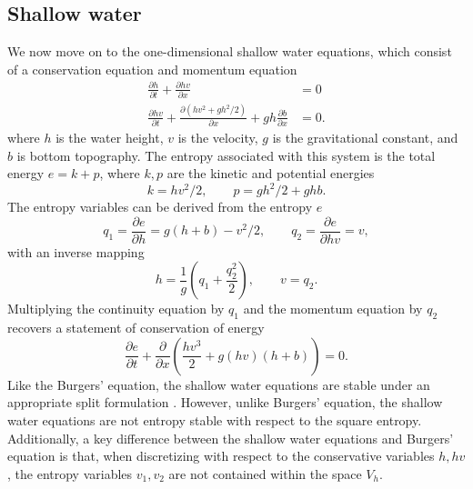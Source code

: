 \documentclass[preprint,10pt]{article}
\theoremstyle{definition}
\theoremstyle{lemma}
\theoremstyle{theorem}
\theoremstyle{assumption}
\newcommand{\pd}[2]{\frac{\partial#1}{\partial#2}}
\newcommand{\LRp}[1]{\left( #1 \right)}
\newcommand{\note}[1]{{\color{blue}{#1}}}
\begin{document}
%
%

%

\subsection{Shallow water}

We now move on to the one-dimensional shallow water equations, which consist of a conservation equation and momentum equation
\begin{align*}
\pd{h}{t} + \pd{hv}{x} &= 0\\
\pd{hv}{t} + \pd{\LRp{hv^2 + gh^2/2}}{x} + gh\pd{b}{x}&= 0.
\end{align*}
where $h$ is the water height, $v$ is the velocity, $g$ is the gravitational constant, and $b$ is bottom topography.  The entropy associated with this system is the total energy $e = k + p$, where $k, p$ are the kinetic and potential energies
\[
k = hv^2/2, \qquad p = gh^2/2 + ghb.
\]
The entropy variables can be derived from the entropy $e$
\[
q_1 = \pd{e}{h} = g(h+b)-v^2/2, \qquad q_2 = \pd{e}{hv} = v,
\]
with an inverse mapping
\[
h = \frac{1}{g}\LRp{q_1 + \frac{q_2^2}{2}}, \qquad v = q_2.
\]
Multiplying the continuity equation by $q_1$ and the momentum equation by $q_2$ recovers a statement of conservation of energy
\[
\pd{e}{t} + \pd{}{x}\LRp{\frac{hv^3}{2} + g(hv)(h+b)} = 0.  
\]
Like the Burgers' equation, the shallow water equations are stable under an appropriate split formulation \cite{gassner2016well, chen2017entropy}.  However, unlike Burgers' equation, the shallow water equations are not entropy stable with respect to the square entropy.  Additionally, a key difference between the shallow water equations and Burgers' equation is that, when discretizing with respect to the conservative variables $h, hv$, the entropy variables $v_1,v_2$ are not contained within the space $V_h$.  
\end{document}
